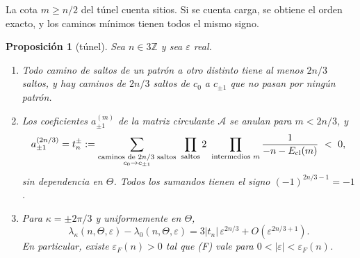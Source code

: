 \documentclass[11pt,a4paper]{article}
\newtheorem{proposicion}[teorema]{Proposición}
\theoremstyle{definition}
\theoremstyle{remark}
\newcommand{\eps}{\varepsilon}
\begin{document}
La cota $m\ge n/2$ del túnel cuenta sitios. Si se cuenta carga, se obtiene el orden exacto, y los caminos
mínimos tienen todos el mismo signo.

\begin{proposicion}[túnel]\label{prop:tunel}
Sea $n\in3\mathbb Z$ y sea $\eps$ real.
\begin{enumerate}
\item Todo camino de saltos de un patrón a otro distinto tiene al menos $2n/3$ saltos, y hay caminos de
  $2n/3$ saltos de $c_0$ a $c_{\pm1}$ que no pasan por ningún patrón.
\item Los coeficientes $a_{\pm1}^{(m)}$ de la matriz circulante $\mathcal A$ se anulan para $m<2n/3$, y
  \[
    a_{\pm1}^{(2n/3)}=t_n^\pm:=\sum_{\substack{\text{caminos de }2n/3\text{ saltos}\\ c_0\to c_{\pm1}}}\
    \prod_{\text{saltos}}2\ \prod_{\text{intermedios }m}\frac1{-n-E_{\rm cl}(m)}\ <\ 0 ,
  \]
  sin dependencia en $\Theta$. Todos los sumandos tienen el signo $(-1)^{2n/3-1}=-1$.
\item Para $\kappa=\pm2\pi/3$ y uniformemente en $\Theta$,
  \[
    \lambda_\kappa(n,\Theta,\eps)-\lambda_0(n,\Theta,\eps)=3|t_n|\,\eps^{2n/3}+O(\eps^{2n/3+1}).
  \]
  En particular, existe $\eps_F(n)>0$ tal que (F) vale para $0<|\eps|<\eps_F(n)$.
\end{enumerate}
\end{proposicion}
\end{document}
